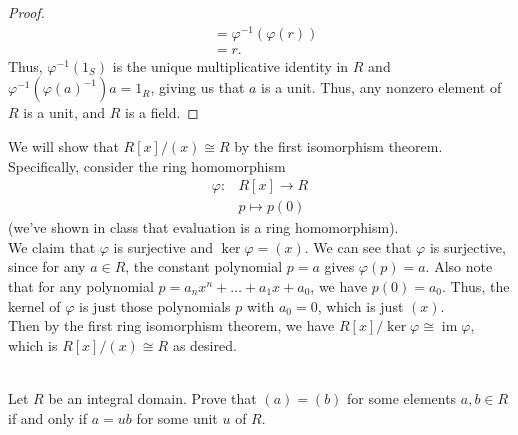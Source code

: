\documentclass[12 pt, letterpaper]{hmcpset}
\begin{document}
\begin{solution}
\begin{proof}
\[\begin{split}
						      & = \varphi^{-1}(\varphi(r)) \\
						      & = r.
			\end{split}
		\]
		Thus, $\varphi^{-1}(1_{S})$ is the unique multiplicative identity in $R$ and $\varphi^{-1}(\varphi(a)^{-1}) a = 1_{R}$, giving us that $a$ is a unit. Thus, any nonzero element of $R$ is a unit, and $R$ is a field.
	\end{proof}
	We will show that $R[x]/(x) \cong R$ by the first isomorphism theorem. Specifically, consider the ring homomorphism
	\[
		\begin{split}
			\varphi \colon & R[x] \to R \\
				       & p \mapsto p(0)
		\end{split}
	\]
	(we've shown in class that evaluation is a ring homomorphism). \\
	
	We claim that $\varphi$ is surjective and $\ker \varphi = (x)$. We can see that $\varphi$ is surjective, since for any $a \in R$, the constant polynomial $p = a$ gives $\varphi(p) = a$.  Also note that for any polynomial $p = a_{n} x^{n} + \dots + a_{1} x + a_{0}$, we have $p(0) = a_{0}$. Thus, the kernel of $\varphi$ is just those polynomials $p$ with $a_{0} = 0$, which is just $(x)$. \\
	
	Then by the first ring isomorphism theorem, we have $R[x]/\ker \varphi \cong \operatorname{im} \varphi$, which is $R[x]/(x) \cong R$ as desired. \\\\
	
\end{solution}

\pagebreak

\begin{problem}
	Let $R$ be an integral domain. Prove that $(a) = (b)$ for some elements $a, b \in R$ if and only if $a = ub$ for some unit $u$ of $R$.
\end{problem}
\end{document}
